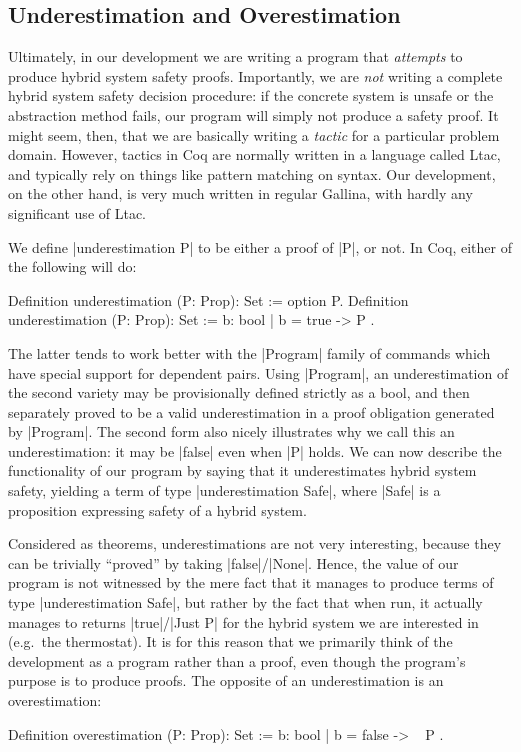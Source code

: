 \documentclass[runningheads]{llncs}
\begin{document}
\subsection{Underestimation and Overestimation}
\label{estimation}

Ultimately, in our development we are writing a program that
\emph{attempts} to produce hybrid system safety proofs. Importantly,
we are \emph{not} writing a complete hybrid system safety decision
procedure: if the concrete system is unsafe or the abstraction method
fails, our program will simply not produce a safety proof. It might
seem, then, that we are basically writing a \emph{tactic} for a
particular problem domain. However, tactics in Coq are normally
written in a language called Ltac, and typically rely on things like
pattern matching on syntax. Our development, on the other hand, is
very much written in regular Gallina, with hardly any significant use
of Ltac. 

We define |underestimation P| to be either a proof of
|P|, or not. In Coq, either of the following will do:
\begin{code}
Definition underestimation (P: Prop): Set := option P.
Definition underestimation (P: Prop): Set := { b: bool | b = true -> P }.
\end{code}
The latter tends to work better with the |Program| family of commands
\cite{sozeau} which have special support for dependent pairs. Using
|Program|, an underestimation of the second variety may be
provisionally defined strictly as a bool, and then separately proved
to be a valid underestimation in a proof obligation generated by
|Program|. The second form also nicely illustrates why we call this an
underestimation: it may be |false| even when |P| holds. We can now
describe the functionality of our program by saying that it
underestimates hybrid system safety, yielding a term of type
|underestimation Safe|, where |Safe| is a proposition expressing
safety of a hybrid system.

Considered as theorems, underestimations are not very interesting,
because they can be trivially ``proved'' by taking
|false|/|None|. Hence, the value of our program is not witnessed by
the mere fact that it manages to produce terms of type
|underestimation Safe|, but rather by the fact that when run, it
actually manages to returns |true|/|Just P| for the hybrid system we
are interested in (e.g.\ the thermostat). It is for this reason that
we primarily think of the development as a program rather than a
proof, even though the program's purpose is to produce proofs.
The opposite of an underestimation is an overestimation:
\begin{code}
Definition overestimation (P: Prop): Set := { b: bool | b = false -> ~ P }.
\end{code}
\end{document}
